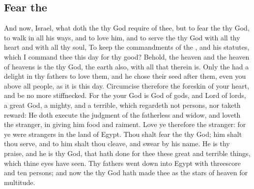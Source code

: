 \begin{biblechapter}
\section*{Fear the \LORD}
\verse And now, Israel, what doth the \LORD thy God require of thee, but to fear the \LORD thy God, to walk in all his ways, and to love him, and to serve the \LORD thy God with all thy heart and with all thy soul,
\verse To keep the commandments of the \LORD, and his statutes, which I command thee this day for thy good?
\verse Behold, the heaven and the heaven of heavens is the \LORDs thy God, the earth also, with all that therein is.
\verse Only the \LORD had a delight in thy fathers to love them, and he chose their seed after them, even you above all people, as it is this day.
\verse Circumcise therefore the foreskin of your heart, and be no more stiffnecked.
\verse For the \LORD your God is God of gods, and Lord of lords, a great God, a mighty, and a terrible, which regardeth not persons, nor taketh reward:
\verse He doth execute the judgment of the fatherless and widow, and loveth the stranger, in giving him food and raiment.
\verse Love ye therefore the stranger: for ye were strangers in the land of Egypt.
\verse Thou shalt fear the \LORD thy God; him shalt thou serve, and to him shalt thou cleave, and swear by his name.
\verse He is thy praise, and he is thy God, that hath done for thee these great and terrible things, which thine eyes have seen.
\verse Thy fathers went down into Egypt with threescore and ten persons; and now the \LORD thy God hath made thee as the stars of heaven for multitude.
\end{biblechapter}

